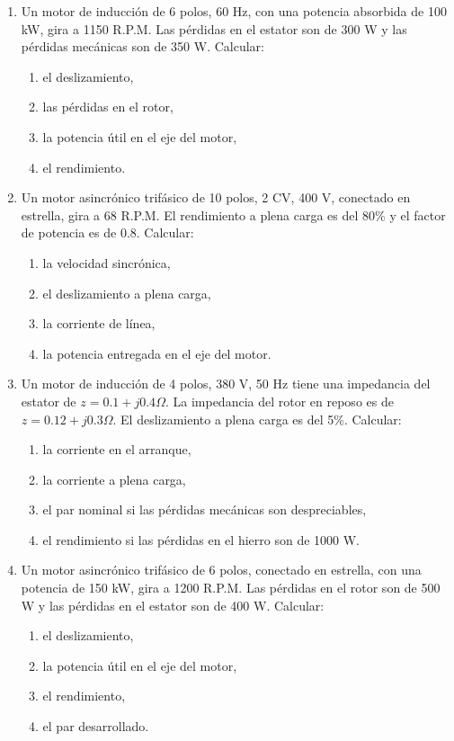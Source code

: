 \documentclass[../main]{subfiles}
\begin{document}
\begin{enumerate}
    \item Un motor de inducción de 6 polos, 60 Hz, con una potencia absorbida de 100 kW, gira a 1150 R.P.M. Las pérdidas en el estator son de 300 W y las pérdidas mecánicas son de 350 W. Calcular:
    \begin{enumerate}
        \item el deslizamiento,
        \item las pérdidas en el rotor,
        \item la potencia útil en el eje del motor,
        \item el rendimiento.
    \end{enumerate}
    
    \item Un motor asincrónico trifásico de 10 polos, 2 CV, 400 V, conectado en estrella, gira a 68 R.P.M. El rendimiento a plena carga es del 80\% y el factor de potencia es de 0.8. Calcular:
    \begin{enumerate}
        \item la velocidad sincrónica,
        \item el deslizamiento a plena carga,
        \item la corriente de línea,
        \item la potencia entregada en el eje del motor.
    \end{enumerate}
    
    \item Un motor de inducción de 4 polos, 380 V, 50 Hz tiene una impedancia del estator de $z = 0.1 + j0.4 \Omega$. La impedancia del rotor en reposo es de $z = 0.12 + j0.3 \Omega$. El deslizamiento a plena carga es del 5\%. Calcular:
    \begin{enumerate}
        \item la corriente en el arranque,
        \item la corriente a plena carga,
        \item el par nominal si las pérdidas mecánicas son despreciables,
        \item el rendimiento si las pérdidas en el hierro son de 1000 W.
    \end{enumerate}
    
    \item Un motor asincrónico trifásico de 6 polos, conectado en estrella, con una potencia de 150 kW, gira a 1200 R.P.M. Las pérdidas en el rotor son de 500 W y las pérdidas en el estator son de 400 W. Calcular:
    \begin{enumerate}
        \item el deslizamiento,
        \item la potencia útil en el eje del motor,
        \item el rendimiento,
        \item el par desarrollado.
    \end{enumerate}
    

\end{enumerate}
\end{document}
